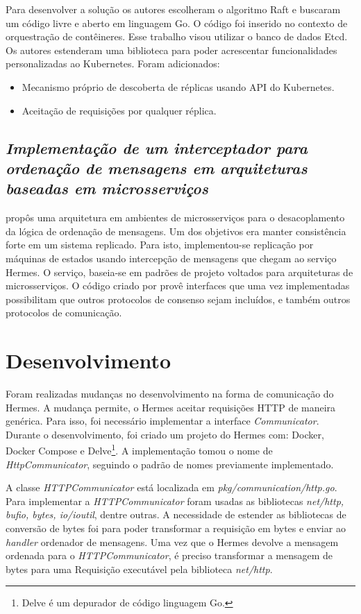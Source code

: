 \documentclass[12pt]{article}
\begin{document}
Para desenvolver a solução os autores escolheram o algoritmo Raft e buscaram um código livre e aberto em linguagem Go. O código foi inserido no contexto de orquestração de contêineres. Esse trabalho visou utilizar o banco de dados Etcd. Os autores estenderam uma biblioteca para poder acrescentar funcionalidades personalizadas ao Kubernetes. Foram adicionados:

\begin{itemize}
\item Mecanismo próprio de descoberta de réplicas usando API do Kubernetes.
\item Aceitação de requisições por qualquer réplica.
\end{itemize}

\subsection{\textit{Implementação de um interceptador para ordenação de mensagens em arquiteturas baseadas em microsserviços}}

\cite{renan2021hermes} propôs uma arquitetura em ambientes de microsserviços para o desacoplamento da lógica de ordenação de mensagens. Um dos objetivos era manter consistência forte em um sistema replicado. Para isto, implementou-se replicação por máquinas de estados usando intercepção de mensagens que chegam ao serviço Hermes. O serviço, baseia-se em padrões de projeto voltados para arquiteturas de microsserviços. O código criado por \cite{renan2021hermes} provê interfaces que uma vez implementadas possibilitam que outros protocolos de consenso sejam incluídos, e também outros protocolos de comunicação.

\section{Desenvolvimento} \label{sec:des}

Foram realizadas mudanças no desenvolvimento na forma de comunicação do Hermes. A mudança permite, o Hermes aceitar requisições HTTP de maneira genérica. Para isso, foi necessário implementar a interface \textit{Communicator}. Durante o desenvolvimento, foi criado um projeto do Hermes com: Docker, Docker Compose e Delve\footnote{Delve é um depurador de código linguagem Go.}. A implementação tomou o nome de \textit{HttpCommunicator}, seguindo o padrão de nomes previamente implementado.

A classe \textit{HTTPCommunicator} está localizada em \textit{pkg/communication/http.go}. Para implementar a \textit{HTTPCommunicator} foram usadas as bibliotecas \textit{net/http, bufio, bytes, io/ioutil}, dentre outras. A necessidade de estender as bibliotecas de conversão de bytes foi para poder transformar a requisição em bytes e enviar ao \textit{handler} ordenador de mensagens. Uma vez que o Hermes devolve a mensagem ordenada para o \textit{HTTPCommunicator}, é preciso transformar a mensagem de bytes para uma Requisição executável pela biblioteca \textit{net/http}.
\end{document}
